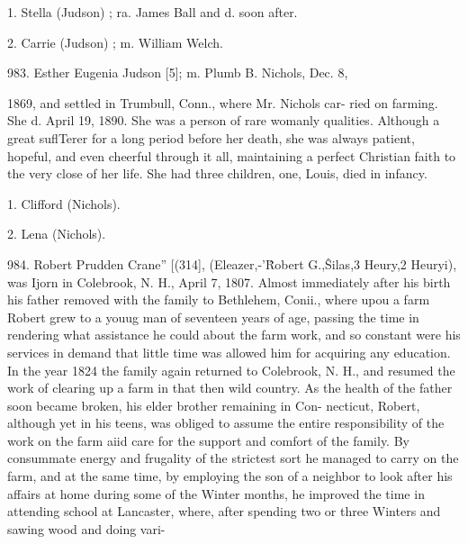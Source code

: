 \documentclass{book}
\begin{document}
1. Stella (Judson) ; ra. James Ball and d. soon after. 

2. Carrie (Judson) ; m. William Welch. 

983. Esther Eugenia Judson [5]; m. Plumb B. Nichols, Dec. 8, 

1869, and settled in Trumbull, Conn., where Mr. Nichols car- 
ried on farming. She d. April 19, 1890. She was a person of 
rare womanly qualities. Although a great suflTerer for a long 
period before her death, she was always patient, hopeful, and 
even cheerful through it all, maintaining a perfect Christian 
faith to the very close of her life. She had three children, 
one, Louis, died in infancy. 

1. Clifford (Nichols). 

2. Lena (Nichols). 

984. Robert Prudden Crane'' [(314], (Eleazer,-'\^ Robert G.,\^ 
Silas,3 Heury,2 Heuryi), was Ijorn in Colebrook, N. H., April 7, 
1807. Almost immediately after his birth his father removed 
with the family to Bethlehem, Conii., where upou a farm Robert 
grew to a youug man of seventeen years of age, passing the time 
in rendering what assistance he could about the farm work, and 
so constant were his services in demand that little time was allowed 
him for acquiring any education. In the year 1824 the family 
again returned to Colebrook, N. H., and resumed the work of 
clearing up a farm in that then wild country. As the health of the 
father soon became broken, his elder brother remaining in Con- 
necticut, Robert, although yet in his teens, was obliged to assume 
the entire responsibility of the work on the farm aiid care for the 
support and comfort of the family. By consummate energy and 
frugality of the strictest sort he managed to carry on the farm, 
and at the same time, by employing the son of a neighbor to look 
after his affairs at home during some of the Winter months, he 
improved the time in attending school at Lancaster, where, after 
spending two or three Winters and sawing wood and doing vari- 
\end{document}

